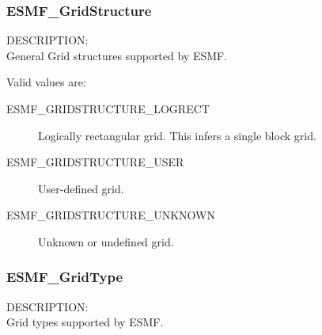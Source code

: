 
\subsubsection{ESMF\_GridStructure}

{\sf DESCRIPTION:\\}
General Grid structures supported by ESMF.

Valid values are:
\begin{description}
   \item [ESMF_GRIDSTRUCTURE_LOGRECT]
         Logically rectangular grid.  This infers a single block grid.

   \item [ESMF_GRIDSTRUCTURE_USER]
         User-defined grid.

   \item [ESMF_GRIDSTRUCTURE_UNKNOWN]
         Unknown or undefined grid.
\end{description}


\subsubsection{ESMF\_GridType}

{\sf DESCRIPTION:\\}
Grid types supported by ESMF.

